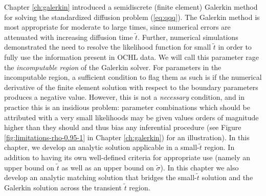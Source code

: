 \label{ch:small-time}

Chapter \ref{ch:galerkin} introduced a semidiscrete (finite element)
Galerkin method for solving the standardized diffusion problem
(\ref{eq:qqq}). The Galerkin method is most appropriate for moderate
to large times, since numerical errors are attenuated with increasing
diffusion time $\tilde{t}$. Further, numerical simulations
demonstrated the need to resolve the likelihood function for small
$\tilde{t}$ in order to fully use the information present in OCHL
data. We will call this parameter rage the \textit{incomputable
  region} of the Galerkin solver. For parameters in the incomputable
region, a sufficient condition to flag them as such is if the
numerical derivative of the finite element solution with respect to
the boundary parameters produces a negative value. However, this is
not a \textit{necessary} condition, and in practice this is an
insidious problem: parameter combinations which should be attributed
with a very small likelihoods may be given values orders of magnitude
higher than they should and thus bias any inferential procedure (see
Figure \ref{fig:limitations-rho-0.95-1} in Chapter \ref{ch:galerkin})
for an illustration). In this chapter, we develop an analytic solution
applicable in a small-$\tilde{t}$ region. In addition to having its
own well-defined criteria for appropriate use (namely an upper bound
on $\tilde{t}$ as well as an upper bound on $\tilde{\sigma}$). In this
chapter we also develop an analytic matching solution that bridges the
small-$\tilde{t}$ solution and the Galerkin solution across the
transient $\tilde{t}$ region. 

